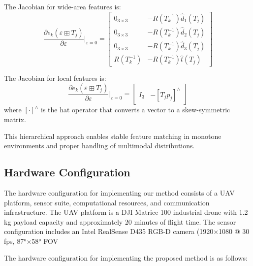 \documentclass[a4paper,fleqn,10pt,twocolumn]{SICE_ISCS}
\begin{document}
The Jacobian for wide-area features is:
\begin{equation}
\frac{\partial e_k(\varepsilon \boxplus T_j)}{\partial \varepsilon}\bigg|_{\varepsilon=0} = \begin{bmatrix} 0_{3 \times 3} & -R(T_k^{-1})\hat{d}_1(T_j) \\ 0_{3 \times 3} & -R(T_k^{-1})\hat{d}_2(T_j) \\ 0_{3 \times 3} & -R(T_k^{-1})\hat{d}_3(T_j) \\ R(T_k^{-1}) & -R(T_k^{-1})\hat{t}(T_j) \end{bmatrix}
\end{equation}

The Jacobian for local features is:
\begin{equation}
\frac{\partial e_k(\varepsilon \boxplus T_j)}{\partial \varepsilon}\bigg|_{\varepsilon=0} = \begin{bmatrix} I_3 & -[T_j p_j]^\wedge \end{bmatrix}
\end{equation}
where $[\cdot]^\wedge$ is the hat operator that converts a vector to a skew-symmetric matrix.

This hierarchical approach enables stable feature matching in monotone environments and proper handling of multimodal distributions.

\subsection{Hardware Configuration}

The hardware configuration for implementing our method consists of a UAV platform, sensor suite, computational resources, and communication infrastructure. The UAV platform is a DJI Matrice 100 industrial drone with 1.2 kg payload capacity and approximately 20 minutes of flight time. The sensor configuration includes an Intel RealSense D435 RGB-D camera (1920×1080 @ 30 fps, 87°×58° FOV

The hardware configuration for implementing the proposed method is as follows:
\end{document}
